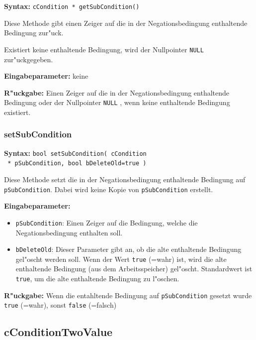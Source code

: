 \textbf{Syntax:} \verb|cCondition * getSubCondition()|

\bigskip\noindent
Diese Methode gibt einen Zeiger auf die in der Negationsbedingung enthaltende Bedingung zur"uck.

Existiert keine enthaltende Bedingung, wird der Nullpointer \verb|NULL| zur"uckgegeben.

\bigskip\noindent
\textbf{Eingabeparameter:} keine

\bigskip\noindent
\textbf{R"uckgabe:} Einen Zeiger auf die in der Negationsbedingung enthaltende Bedingung oder der Nullpointer \verb|NULL| , wenn keine enthaltende Bedingung existiert.


\subsubsection{setSubCondition}

\textbf{Syntax:} \verb|bool setSubCondition( cCondition| \\\verb| * pSubCondition, bool bDeleteOld=true )|

\bigskip\noindent
Diese Methode setzt die in der Negationsbedingung enthaltende Bedingung auf \verb|pSubCondition|. Dabei wird keine Kopie von \verb|pSubCondition| erstellt.

\bigskip\noindent
\textbf{Eingabeparameter:}
\begin{itemize}
 \item \verb|pSubCondition|: Einen Zeiger auf die Bedingung, welche die Negationsbedingung enthalten soll.
 \item \verb|bDeleteOld|: Dieser Parameter gibt an, ob die alte enthaltende Bedingung gel"oscht werden soll. Wenn der Wert \verb|true| (=wahr) ist, wird die alte enthaltende Bedingung (aus dem Arbeitsspeicher) gel"oscht. Standardwert ist \verb|true|, um die alte enthaltende Bedingung zu l"oschen.
\end{itemize}

\bigskip\noindent
\textbf{R"uckgabe:} Wenn die entahltende Bedingung auf \verb|pSubCondition| gesetzt wurde \verb|true| (=wahr), sonst \verb|false| (=falsch)


\subsection{cConditionTwoValue}


